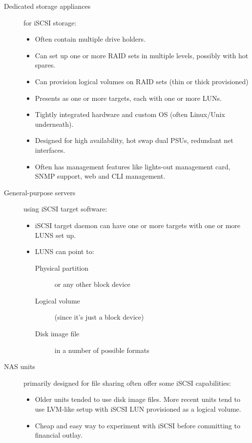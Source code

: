\begin{description}
\item[Dedicated storage appliances]
for iSCSI storage:

\begin{itemize}
\item
  Often contain multiple drive holders.
\item
  Can set up one or more RAID sets in multiple levels, possibly with hot
  spares.
\item
  Can provision logical volumes on RAID sets (thin or thick provisioned)
\item
  Presents as one or more targets, each with one or more LUNs.
\item
  Tightly integrated hardware and custom OS (often Linux/Unix
  underneath).
\item
  Designed for high availability, hot swap dual PSUs, redundant net
  interfaces.
\item
  Often has management features like lights-out management card, SNMP
  support, web and CLI management.
\end{itemize}
\item[General-purpose servers]
using iSCSI target software:

\begin{itemize}
\item
  iSCSI target daemon can have one or more targets with one or more LUNS
  set up.
\item
  LUNS can point to:

  \begin{description}
  \item[Physical partition]
  or any other block device
  \item[Logical volume]
  (since it's just a block device)
  \item[Disk image file]
  in a number of possible formats
  \end{description}
\end{itemize}
\item[NAS units]
primarily designed for file sharing often offer some iSCSI capabilities:

\begin{itemize}
\item
  Older units tended to use disk image files. More recent units tend to
  use LVM-like setup with iSCSI LUN provisioned as a logical volume.
\item
  Cheap and easy way to experiment with iSCSI before committing to
  financial outlay.
\end{itemize}
\end{description}

